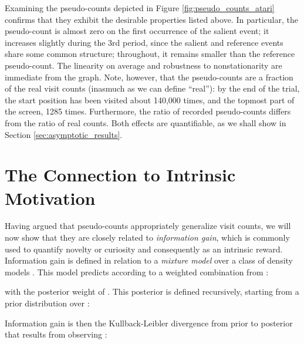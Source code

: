 \documentclass{article}
\newcommand{\gamename}[1]{\textsc{#1}}
\begin{document}
\begin{figure*}[tb]
\caption{
Pseudo-counts obtained from a CTS density model applied to \gamename{Freeway}, along with a frame representative of the salient event (crossing the road). Shaded areas depict periods during which the agent observes the salient event, dotted lines interpolate across periods during which the salient event is not observed. The reported values are 10,000-frame averages.\label{fig:pseudo_counts_atari}} 
\end{figure*}

Examining the pseudo-counts depicted in Figure \ref{fig:pseudo_counts_atari} confirms that they exhibit the desirable properties listed above. In particular, the pseudo-count is almost zero on the first occurrence of the salient event; it increases slightly during the 3rd period, since the salient and reference events share some common structure; throughout, it remains smaller than the reference pseudo-count. The linearity on average and robustness to nonstationarity are immediate from the graph. Note, however, that the pseudo-counts are a fraction of the real visit counts (inasmuch as we can define ``real''): by the end of the trial, the start position has been visited about 140,000 times, and the topmost part of the screen, 1285 times. Furthermore, the ratio of recorded pseudo-counts differs from the ratio of real counts. Both effects are quantifiable, as we shall show in Section \ref{sec:asymptotic_results}.

\section{The Connection to Intrinsic Motivation}\label{sec:connection_to_intrinsic_motivation}

Having argued that pseudo-counts appropriately generalize visit counts, we will now show that they are closely related to \emph{information gain}, which is commonly used to quantify novelty or curiosity and consequently as an intrinsic reward. 
Information gain is defined in relation to a \emph{mixture model}  over a class of density models . This model predicts according to a weighted combination from :

with  the posterior weight of . This posterior is defined recursively, starting from a prior distribution  over :

Information gain is then the Kullback-Leibler divergence from prior to posterior that results from observing :
\end{document}
